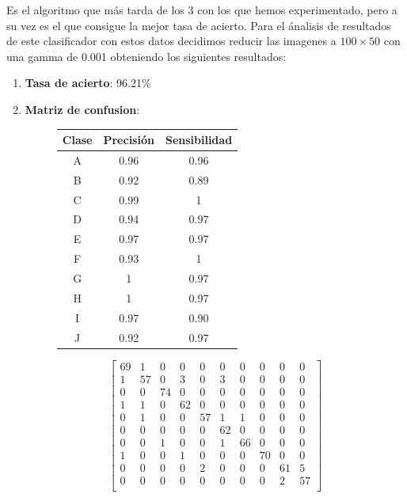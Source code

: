 \documentclass[8pt,a4paper]{article}
\begin{document}
Es el algoritmo que más tarda de los 3 con los que hemos experimentado, pero a su vez es el que consigue la mejor tasa de acierto. Para el ánalisis de resultados de este clasificador con estos datos decidimos reducir las imagenes a $100\times50$ con una gamma de 0.001 obteniendo los siguientes resultados:
\begin{enumerate}
\item \textbf{Tasa de acierto}: 96.21$\%$
\item \textbf{Matriz de confusion}:
	
\begin{figure}[htbp]
\centering
\begin{minipage}{.5\textwidth}
    \begin{tabular}{|c|c|c|} %
    \hline
      \textbf{Clase} & \textbf{Precisión} & \textbf{Sensibilidad}\\
      \hline
      A & 0.96 & 0.96\\
      \hline
      B & 0.92 & 0.89\\
      \hline
      C & 0.99 & 1\\
      \hline
      D & 0.94 & 0.97\\
      \hline
      E & 0.97 & 0.97\\
      \hline
      F & 0.93 & 1\\
      \hline
      G & 1    & 0.97\\
      \hline
      H & 1    & 0.97\\
      \hline
      I & 0.97 & 0.90\\
      \hline
      J & 0.92 & 0.97\\
      \hline
    \end{tabular}
\end{minipage}%
\begin{minipage}{.5\textwidth}
\[
  \begin{bmatrix}
    69 & 1 & 0 & 0 & 0 & 0 & 0 & 0 & 0 & 0 \\
    1 & 57 & 0 & 3 & 0 & 3 & 0 & 0 & 0 & 0 \\
    0 & 0 & 74 & 0 & 0 & 0 & 0 & 0 & 0 & 0 \\
    1 & 1 & 0 & 62 & 0 & 0 & 0 & 0 & 0 & 0 \\
    0 & 1 & 0 & 0 & 57 & 1 & 1 & 0 & 0 & 0 \\
    0 & 0 & 0 & 0 & 0 & 62 & 0 & 0 & 0 & 0 \\
    0 & 0 & 1 & 0 & 0 & 1 & 66 & 0 & 0 & 0 \\
    1 & 0 & 0 & 1 & 0 & 0 & 0 & 70 & 0 & 0 \\
    0 & 0 & 0 & 0 & 2 & 0 & 0 & 0 & 61 & 5 \\
    0 & 0 & 0 & 0 & 0 & 0 & 0 & 0 & 2 & 57 \\
  \end{bmatrix}
\]
\end{minipage}
\end{figure}


\end{enumerate}
\end{document}

